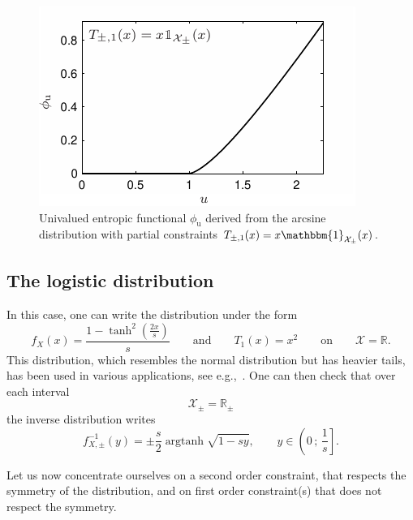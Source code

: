\documentclass[entropy,article,submit,moreauthors,pdftex]{Definitions/mdpi}
\def\Rset{\mathbb{R}}%
\def\X{\mathcal{X}}%
\def\un{\mathbbm{1}}%
\def\argtanh{\operatorname{argtanh}}%
\def\u{\mathrm{u}}
\begin{document}
\begin{figure}[htbp]
  \begin{minipage}{.6\columnwidth}
    \centerline{\includegraphics[width=.9\textwidth]{PDF/MaxEnt_ArcsineLaw}}
  \end{minipage}
  \begin{minipage}{.4\columnwidth}
    \caption{Univalued entropic  functional $\phi_\u$  derived from  the arcsine
      distribution with partial constraints $T_{\pm,1}(x) = x \un_{\X_\pm}(x)$.}
    \label{fig:Entropy-arcsin}
  \end{minipage}
\end{figure}



\subsection{The logistic distribution}
\label{subsecapp:Logistic}

In this case, one can write the distribution under the form
%
\[
f_X(x)  =  \frac{1  - \tanh^2\left(\frac{2  x}{s}\right)}{s}  \qquad  \mbox{and}
\qquad T_1(x) = x^2 \qquad \mbox{on} \qquad \X = \Rset.
\]
This  distribution, which  resembles  the normal  distribution  but has  heavier
tails, has been used in  various applications, see e.g.,~\cite{JohKot95:v2}. One
can then check that over each interval
%
\[
\X_\pm = \Rset_\pm
\]
%
the inverse distribution writes
%
\[
f_{X,\pm}^{-1}(y) = \pm \frac{s}{2} \argtanh \sqrt{1 - s y}, \qquad y \in \left(
0 \, ; \, \frac{1}{s} \right].
\]

Let us now concentrate ourselves on a second order constraint, that respects the
symmetry of  the distribution, and  on first  order constraint(s) that  does not
respect the symmetry.
\end{document}
